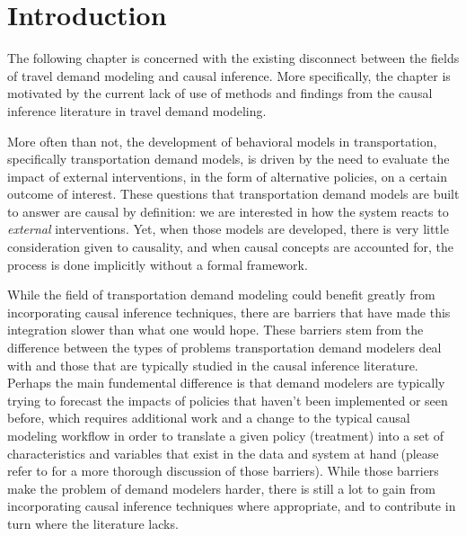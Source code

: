 \section{Introduction}
\label{sec:intro}

The following chapter is concerned with the existing disconnect between the 
fields of travel demand modeling and causal inference. 
More specifically, the chapter is motivated by the current lack of use of methods and findings from 
the causal inference literature in travel demand modeling. 

More often than not, the development of behavioral models in transportation, 
specifically transportation demand models, is driven by the need to evaluate 
the impact of external interventions, in the form of alternative policies, on a 
certain outcome of interest. 
These questions that transportation demand models 
are built to answer are causal by definition: we are interested in how the 
system reacts to \textit{external} interventions. 
Yet, when those models are 
developed, there is very little consideration given to causality, and when 
causal concepts are accounted for, the process is done implicitly without a 
formal framework. 

While the field of transportation demand modeling could benefit greatly from 
incorporating causal inference techniques, there are barriers that have made 
this integration slower than what one would hope. 
These barriers stem from the difference between the types of problems transportation demand modelers deal with and those that are typically studied in the causal inference literature. 
Perhaps the main fundemental difference is that demand modelers 
are typically trying to forecast the impacts of policies that haven't been 
implemented or seen before, which requires additional work and a change to the
typical causal modeling workflow in order to translate a given policy 
(treatment) into a set of characteristics and variables that exist in the
data and system at hand (please refer to \citet{brathwaite_2018_causal} for a 
more thorough discussion of those barriers). 
While those barriers make the problem of demand modelers harder, there is still a lot to gain from 
incorporating causal inference techniques where appropriate, and to contribute
in turn where the literature lacks.  

